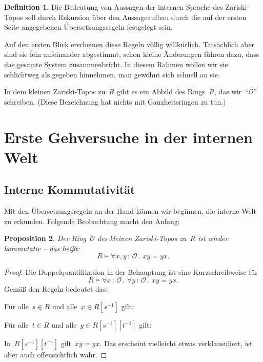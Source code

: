 \documentclass[a4paper,ngerman,12pt]{scrartcl}
\theoremstyle{definition}
\newtheorem{defn}{Definition}[section]
\theoremstyle{plain}
\newtheorem{prop}[defn]{Proposition}
\theoremstyle{remark}
\renewcommand{\O}{\mathcal{O}}
\renewcommand{\_}{\mathpunct{.}\,}
\newcommand{\?}{\,{:}\,}
\newenvironment{indentblock}{%
  \list{}{\leftmargin\leftmargin}%
  \item\relax
}{%
  \endlist
}
\begin{document}
\begin{defn}Die Bedeutung von Aussagen der internen Sprache des Zariski-Topos
soll durch Rekursion über den Aussageaufbau durch die auf der ersten Seite
angegebenen Übersetzungsregeln festgelegt sein.\end{defn}

Auf den ersten Blick erscheinen diese Regeln völlig
willkürlich. Tatsächlich aber sind sie fein aufeinander abgestimmt, schon
kleine Änderungen führen dazu, dass das gesamte System zusammenbricht. In
diesem Rahmen wollen wir sie schlichtweg als gegeben hinnehmen, man gewöhnt
sich schnell an sie.

In dem kleinen Zariski-Topos zu~$R$ gibt es ein Abbild des Rings~$R$, das
wir~"`$\O$"' schreiben. (Diese Bezeichnung hat nichts mit Ganzheitsringen zu tun.)


\section{Erste Gehversuche in der internen Welt}

\subsection{Interne Kommutativität}

Mit den Übersetzungsregeln an der Hand können wir beginnen, die interne Welt zu
erkunden. Folgende Beobachtung macht den Anfang:

\begin{prop}Der Ring~$\O$ des kleinen Zariski-Topos zu~$R$ ist wieder
kommutativ -- das heißt:
\[ R \models \forall x,y \? \O\_ x y = y x. \]
\end{prop}
\begin{proof}Die Doppelquantifikation in der Behauptung ist eine
Kurzschreibweise für
\[ R \models \forall x\?\O\_ \forall y\?\O\_ x y = y x. \]
Gemäß den Regeln bedeutet das:
\begin{indentblock}
Für alle~$s \in R$ und alle~$x \in R[s^{-1}]$ gilt:
\begin{indentblock}
Für alle~$t \in R$ und alle~$y \in R[s^{-1}][t^{-1}]$ gilt:
\begin{indentblock}
In~$R[s^{-1}][t^{-1}]$ gilt~$xy = yx$.
\end{indentblock}
\end{indentblock}
\end{indentblock}
Das erscheint vielleicht etwas verklausuliert, ist aber auch offensichtlich
wahr.
\end{proof}
\end{document}
